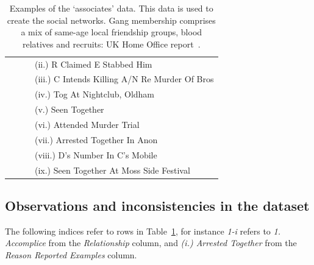 \documentclass[twocolumn]{svjour3}          %
\theoremstyle{definition}
\begin{document}
\begin{table}[!ht]
{\begin{tabular}{|c|l|l|l|}
  &   &   &  (ii.) R Claimed E Stabbed Him \\ 
  &   &   &  (iii.) C Intends Killing A/N Re Murder Of Bros \\ 
  &   &   &  (iv.) Tog At Nightclub, Oldham \\ 
  &   &   &  (v.) Seen Together \\ 
  &   &   &  (vi.) Attended Murder Trial \\ 
  &   &   &  (vii.) Arrested Together In Anon \\ 
  &   &   &  (viii.) D's Number In C's Mobile \\ 
  &   &   &  (ix.) Seen Together At Moss Side Festival \\ 
\hline
\end{tabular}}
  \caption{Examples of the `associates' data. This data is used to
    create the social networks. Gang membership comprises a mix of same-age local friendship
groups, blood relatives and recruits: UK Home Office
report~\cite{BullockTilley2002}.}
  \label{tab:associates}
\end{table}


\subsection{Observations and inconsistencies in the dataset}\label{sec:observations}

The following indices refer to rows in Table~\ref{tab:associates}, for
instance \emph{1-i} refers to \emph{1. Accomplice} from the
\emph{Relationship} column, and \emph{(i.) Arrested Together} from
the \emph{Reason Reported Examples} column.
\end{document}
